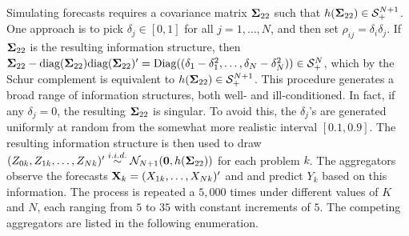 \documentclass[11pt]{article}
\newtheorem{proposition}[theorem]{Proposition}
\theoremstyle{definition}
\theoremstyle{definition}
\def\bSigma{{\bf \Sigma}}
\def\X{{\bf X}}
\def\Z{{\bf Z}}
\def\diag{\text{diag}}
\def\Diag{\text{Diag}}
\def\diag{\text{diag}}
\begin{document}
Simulating forecasts requires a covariance matrix $\bSigma_{22}$ such that $h(\bSigma_{22}) \in \mathcal{S}_{+}^{N+1}$. 
One approach is to pick $\delta_j \in [0,1]$ for all $j = 1, \dots, N$, and then set $\rho_{ij} = \delta_i \delta_j$. If  $\bSigma_{22}$ is the resulting information structure, then $\bSigma_{22} - \diag(\bSigma_{22})\diag(\bSigma_{22})' = \Diag((\delta_1 - \delta_1^2, \dots, \delta_N - \delta_N^2)) \in \mathcal{S}_{+}^{N}$, which by the Schur complement is equivalent to $h(\bSigma_{22}) \in \mathcal{S}_{+}^{N+1}$. 
This procedure generates a broad range of information structures, both well- and ill-conditioned. In fact, if any $\delta_j = 0$, the resulting $\bSigma_{22}$ is singular.  To avoid this, the $\delta_j$'s are generated uniformly at random from the somewhat more realistic interval $[0.1, 0.9]$. The resulting information structure is then used to draw $(Z_{0k}, Z_{1k}, \dots, Z_{Nk})' \stackrel{i.i.d.}{\sim} \mathcal{N}_{N+1}(\boldsymbol{0}, h(\bSigma_{22}))$ for each problem $k$. The aggregators observe the forecasts $\X_k =  (X_{1k}, \dots, X_{Nk})'$ and 
 and predict $Y_{k}$ based on this information. The process is repeated a $5,000$ times under different values of $K$ and $N$, each ranging from $5$ to $35$ with constant increments of $5$. 
The competing aggregators are listed in the following enumeration.  
\end{document}
